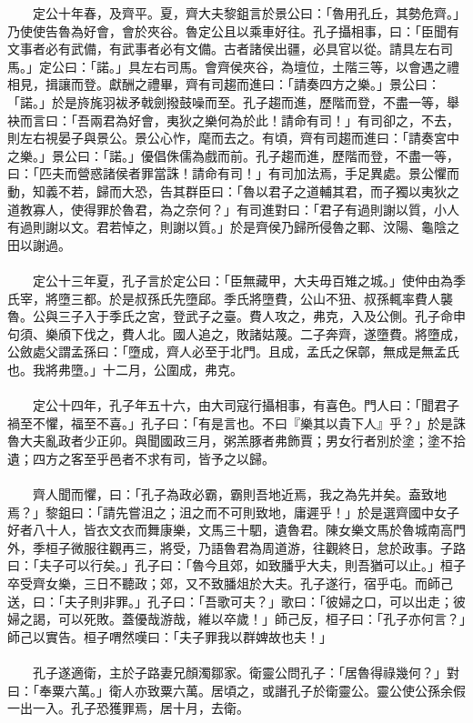 　　定公十年春，及齊平。夏，齊大夫黎鉏言於景公曰：「魯用孔丘，其勢危齊。」乃使使告魯為好會，會於夾谷。魯定公且以乘車好往。孔子攝相事，曰：「臣聞有文事者必有武備，有武事者必有文備。古者諸侯出疆，必具官以從。請具左右司馬。」定公曰：「諾。」具左右司馬。會齊侯夾谷，為壇位，土階三等，以會遇之禮相見，揖讓而登。獻酬之禮畢，齊有司趨而進曰：「請奏四方之樂。」景公曰：「諾。」於是旍旄羽袚矛戟劍撥鼓噪而至。孔子趨而進，歷階而登，不盡一等，舉袂而言曰：「吾兩君為好會，夷狄之樂何為於此！請命有司！」有司卻之，不去，則左右視晏子與景公。景公心怍，麾而去之。有頃，齊有司趨而進曰：「請奏宮中之樂。」景公曰：「諾。」優倡侏儒為戲而前。孔子趨而進，歷階而登，不盡一等，曰：「匹夫而營惑諸侯者罪當誅！請命有司！」有司加法焉，手足異處。景公懼而動，知義不若，歸而大恐，告其群臣曰：「魯以君子之道輔其君，而子獨以夷狄之道教寡人，使得罪於魯君，為之奈何？」有司進對曰：「君子有過則謝以質，小人有過則謝以文。君若悼之，則謝以質。」於是齊侯乃歸所侵魯之鄆、汶陽、龜陰之田以謝過。
\\\\
　　定公十三年夏，孔子言於定公曰：「臣無藏甲，大夫毋百雉之城。」使仲由為季氏宰，將墮三都。於是叔孫氏先墮郈。季氏將墮費，公山不狃、叔孫輒率費人襲魯。公與三子入于季氏之宮，登武子之臺。費人攻之，弗克，入及公側。孔子命申句須、樂頎下伐之，費人北。國人追之，敗諸姑蔑。二子奔齊，遂墮費。將墮成，公斂處父謂孟孫曰：「墮成，齊人必至于北門。且成，孟氏之保鄣，無成是無孟氏也。我將弗墮。」十二月，公圍成，弗克。
\\\\
　　定公十四年，孔子年五十六，由大司寇行攝相事，有喜色。門人曰：「聞君子禍至不懼，福至不喜。」孔子曰：「有是言也。不曰『樂其以貴下人』乎？」於是誅魯大夫亂政者少正卯。與聞國政三月，粥羔豚者弗飾賈；男女行者別於塗；塗不拾遺；四方之客至乎邑者不求有司，皆予之以歸。
\\\\
　　齊人聞而懼，曰：「孔子為政必霸，霸則吾地近焉，我之為先并矣。盍致地焉？」黎鉏曰：「請先嘗沮之；沮之而不可則致地，庸遲乎！」於是選齊國中女子好者八十人，皆衣文衣而舞康樂，文馬三十駟，遺魯君。陳女樂文馬於魯城南高門外，季桓子微服往觀再三，將受，乃語魯君為周道游，往觀終日，怠於政事。子路曰：「夫子可以行矣。」孔子曰：「魯今且郊，如致膰乎大夫，則吾猶可以止。」桓子卒受齊女樂，三日不聽政；郊，又不致膰俎於大夫。孔子遂行，宿乎屯。而師己送，曰：「夫子則非罪。」孔子曰：「吾歌可夫？」歌曰：「彼婦之口，可以出走；彼婦之謁，可以死敗。蓋優哉游哉，維以卒歲！」師己反，桓子曰：「孔子亦何言？」師己以實告。桓子喟然嘆曰：「夫子罪我以群婢故也夫！」
\\\\
　　孔子遂適衛，主於子路妻兄顏濁鄒家。衛靈公問孔子：「居魯得祿幾何？」對曰：「奉粟六萬。」衛人亦致粟六萬。居頃之，或譖孔子於衛靈公。靈公使公孫余假一出一入。孔子恐獲罪焉，居十月，去衛。

